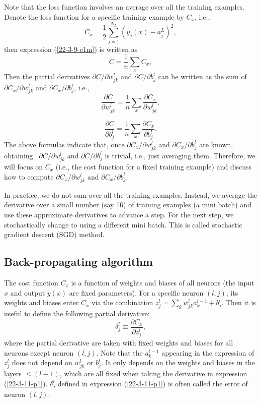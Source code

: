 \documentclass{article}
\begin{document}
Note that the loss function involves an average over all the training
examples. Denote the loss function for a specific training example by $C_x$,
i.e.,
\begin{equation}
  \label{22-3-11-a6} C_x = \frac{1}{2} \sum^{N_L}_{j = 1} (y_j (x) - a^L_j)^2,
\end{equation}
then expression (\ref{22-3-9-e1m}) is written as
\begin{equation}
  C = \frac{1}{n} \sum_x C_x,
\end{equation}
Then the partial derivatives $\partial C / \partial w^l_{j k}$ and $\partial C
/ \partial b^l_j$ can be written as the sum of $\partial C_x / \partial w^l_{j
k}$ and $\partial C_x / \partial b^l_j$, i.e.,
\begin{equation}
  \label{22-3-11-a3} \frac{\partial C}{\partial w_{j k}^l} = \frac{1}{n}
  \sum_x \frac{\partial C_x}{\partial w_{j k}^l},
\end{equation}

\begin{equation}
  \label{22-3-11-a4} \frac{\partial C}{\partial b_j^l} = \frac{1}{n} \sum_x
  \frac{\partial C_x}{\partial b_j^l} .
\end{equation}
The above formulas indicate that, once $\partial C_x / \partial w^l_{j k}$ and
$\partial C_x / \partial b^l_j$ are known, obtaining \ $\partial C / \partial
w^l_{j k}$ and $\partial C / \partial b^l_j$ is trivial, i.e., just averaging
them. Therefore, we will focus on $C_x$ (i.e., the cost function for a fixed
training example) and discuss how to compute $\partial C_x / \partial w^l_{j
k}$ and $\partial C_x / \partial b^l_j$.

In practice, we do not sum over all the training examples. Instead, we
average the derivative over a small number (say 16) of training examples (a
mini batch) and use these approximate derivatives to advance a step. For the
next step, we stochastically change to using a different mini batch. This is
called stochastic gradient descent (SGD) method.

\subsection{Back-propagating algorithm}

The cost function $C_x$ is a function of weights and biases of all neurons
(the input $x$ and output $y (x)$ are fixed parameters). For a specific neuron
$(l, j)$, its weights and biases enter $C_x$ via the combination $z_j^l =
\sum_k w_{j k}^l a^{l - 1}_k + b^l_j$. Then it is useful to define the
following partial derivative:
\begin{equation}
  \label{22-3-11-p1} \delta^l_j \equiv \frac{\partial C_x}{\partial z_j^l},
\end{equation}
where the partial derivative are taken with fixed weights and biases for all
neurons except neuron $(l, j)$. Note that the $a_k^{l - 1}$ appearing in the
expression of $z_j^l$ does not depend on $w^l_{j k}$ or $b^l_j$. It only
depends on the weights and biases in the layers $\leqslant (l - 1)$, which are
all fixed when taking the derivative in expression (\ref{22-3-11-p1}).
$\delta^l_j$ defined in expression (\ref{22-3-11-p1}) is often called the
error of neuron $(l, j)$.
\end{document}
